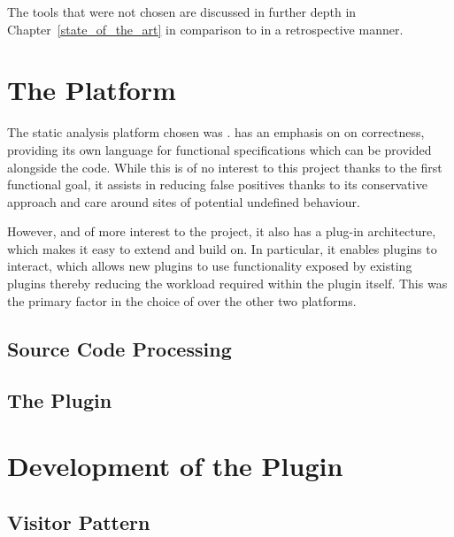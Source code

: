 The tools that were not chosen are discussed in further depth in Chapter~\ref{state_of_the_art} in comparison to  in a retrospective manner.

\section{The  Platform}

The static analysis platform chosen was .  has an emphasis on on correctness, providing its own language for functional specifications which can be provided alongside the code. While this is of no interest to this project thanks to the first functional goal, it assists in reducing false positives thanks to its conservative approach and care around sites of potential undefined behaviour.

However, and of more interest to the project, it also has a plug-in architecture, which makes it easy to extend and build on. In particular, it enables plugins to interact, which allows new plugins to use functionality exposed by existing plugins thereby reducing the workload required within the plugin itself. This was the primary factor in the choice of  over the other two platforms.

\subsection{Source Code Processing}


\subsection{The  Plugin}


\section{Development of the  Plugin}

\subsection{Visitor Pattern}


